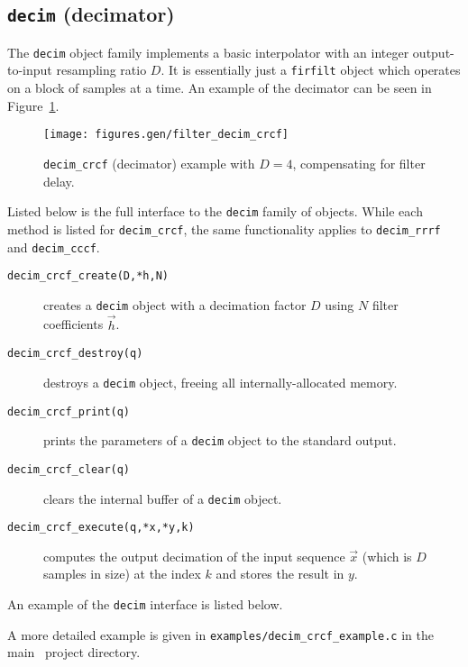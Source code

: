 \subsection{{\tt decim} (decimator)}
\label{module:filter:decim}
The {\tt decim} object family implements a basic interpolator with an
integer output-to-input resampling ratio $D$.
It is essentially just a {\tt firfilt} object which operates on a block
of samples at a time.
An example of the decimator can be seen in
Figure~\ref{fig:module:filter:decim_crcf}.
%
\begin{figure}
\centering
  \texttt{[image: figures.gen/filter\_decim\_crcf]}
\caption{{\tt decim\_crcf} (decimator) example with $D=4$,
         compensating for filter delay.}
\label{fig:module:filter:decim_crcf}
\end{figure}
%
Listed below is the full interface to the {\tt decim} family of
objects.
While each method is listed for {\tt decim\_crcf}, the same
functionality applies to {\tt decim\_rrrf} and {\tt decim\_cccf}.
%
\begin{description}
\item[{\tt decim\_crcf\_create(D,*h,N)}]
    creates a {\tt decim} object with a decimation factor $D$ using $N$
    filter coefficients $\vec{h}$.
\item[{\tt decim\_crcf\_destroy(q)}]
    destroys a {\tt decim} object, freeing all internally-allocated
    memory.
\item[{\tt decim\_crcf\_print(q)}]
    prints the parameters of a {\tt decim} object to the standard
    output.
\item[{\tt decim\_crcf\_clear(q)}]
    clears the internal buffer of a {\tt decim} object.
\item[{\tt decim\_crcf\_execute(q,*x,*y,k)}]
    computes the output decimation of the input sequence $\vec{x}$
    (which is $D$ samples in size) at the index $k$ and stores the
    result in $y$.
\end{description}
%
An example of the {\tt decim} interface is listed below.
%

%
A more detailed example is given in
{\tt examples/decim\_crcf\_example.c}
in the main \liquid\ project directory.


%
%

